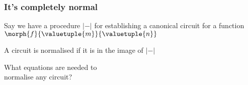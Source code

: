 \begin{frame}
    \frametitle{It's completely normal}

    \centering
    \LARGE

    Say we have a procedure \(\lvert-\rvert\) for
    establishing a \alert{canonical circuit} for a function
    \(\morph{f}{\valuetuple{m}}{\valuetuple{n}}\)

    \await

    \vspace{1em}

    A circuit is \alert{normalised} if it is in the image of \(\lvert-\rvert\)

    \await

    \vspace{1em}

    What equations are needed to \\ normalise any circuit?

\end{frame}
